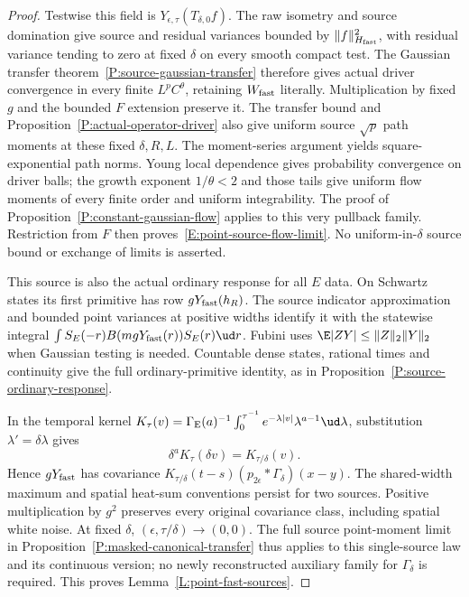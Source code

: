 \begin{proof}
  Testwise this field is $Y_{\epsilon,\tau}(T_{\delta,0}f)$.
  The raw isometry and source domination give source and residual
  variances bounded by $\|f\|_{H_{\rm fast}}^2$, with residual variance
  tending to zero at fixed $\delta$ on every smooth compact test.
  The Gaussian transfer theorem~\ref{P:source-gaussian-transfer}
  therefore gives actual driver convergence in every finite $L^pC^\theta$,
  retaining $W_{\rm fast}$ literally.
  Multiplication by fixed $g$ and the bounded $F$ extension preserve it.
  The transfer bound and Proposition~\ref{P:actual-operator-driver}
  also give uniform source $\sqrt p$ path moments at these fixed
  $\delta,R,L$.
  The moment-series argument yields square-exponential path norms.
  Young local dependence gives probability convergence on driver balls;
  the growth exponent $1/\theta<2$ and those tails give uniform
  flow moments of every finite order and uniform integrability.
  The proof of Proposition~\ref{P:constant-gaussian-flow} applies
  to this very pullback family.
  Restriction from $F$ then proves~\eqref{E:point-source-flow-limit}.
  No uniform-in-$\delta$ source bound or exchange of limits is asserted.

  This source is also the actual ordinary response for all $E$ data.
  On Schwartz states its first primitive has row $gY_{\rm fast}(h_R)$.
  The source indicator approximation and bounded point variances at
  positive widths identify it with the statewise integral
  $\int S_E(-r)B(mgY_{\rm fast}(r))S_E(r)\ud r$.
  Fubini uses $\E|ZY|\le\|Z\|_2\|Y\|_2$ when Gaussian testing is needed.
  Countable dense states, rational times and continuity give the full
  ordinary-primitive identity, as in Proposition~\ref{P:source-ordinary-response}.

  In the temporal kernel
  $K_\tau(v)=\Gamma_{\rm E}(a)^{-1}
  \int_0^{\tau^{-1}}e^{-\lambda|v|}\lambda^{a-1}\ud\lambda$,
  substitution $\lambda'=\delta\lambda$ gives
  \[
    \delta^aK_\tau(\delta v)=K_{\tau/\delta}(v).
  \]
  Hence $gY_{\rm fast}$ has covariance
  $K_{\tau/\delta}(t-s)(p_{2\epsilon}*\Gamma_\delta)(x-y)$.
  The shared-width maximum and spatial heat-sum conventions persist
  for two sources.
  Positive multiplication by $g^2$ preserves every original covariance
  class, including spatial white noise.
  At fixed $\delta$, $(\epsilon,\tau/\delta)\to(0,0)$.
  The full source point-moment limit
  in Proposition~\ref{P:masked-canonical-transfer} thus applies to this
  single-source law and its continuous version; no newly reconstructed
  auxiliary family for $\Gamma_\delta$ is required.
  This proves Lemma~\ref{L:point-fast-sources}.
\end{proof}


